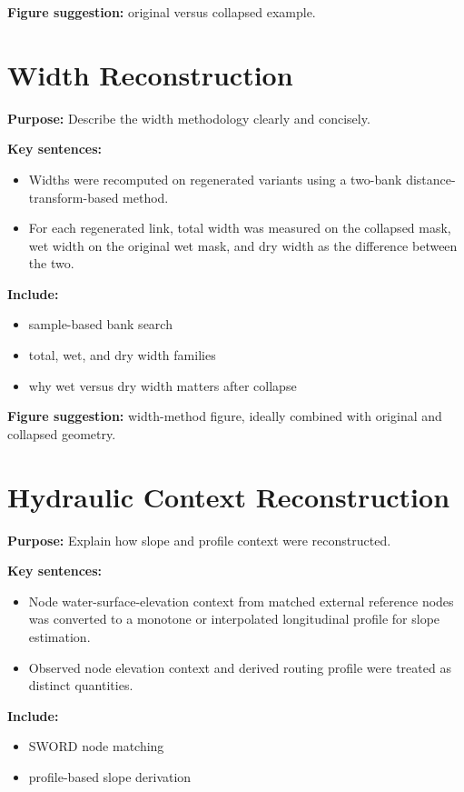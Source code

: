 \documentclass[11pt]{article}
\begin{document}
\textbf{Figure suggestion:} original versus collapsed example.

\section{Width Reconstruction}
\textbf{Purpose:} Describe the width methodology clearly and concisely.

\textbf{Key sentences:}
\begin{itemize}
\item Widths were recomputed on regenerated variants using a two-bank distance-transform-based method.
\item For each regenerated link, total width was measured on the collapsed mask, wet width on the original wet mask, and dry width as the difference between the two.
\end{itemize}

\textbf{Include:}
\begin{itemize}
\item sample-based bank search
\item total, wet, and dry width families
\item why wet versus dry width matters after collapse
\end{itemize}

\textbf{Figure suggestion:} width-method figure, ideally combined with original and collapsed geometry.

\section{Hydraulic Context Reconstruction}
\textbf{Purpose:} Explain how slope and profile context were reconstructed.

\textbf{Key sentences:}
\begin{itemize}
\item Node water-surface-elevation context from matched external reference nodes was converted to a monotone or interpolated longitudinal profile for slope estimation.
\item Observed node elevation context and derived routing profile were treated as distinct quantities.
\end{itemize}

\textbf{Include:}
\begin{itemize}
\item SWORD node matching
\item profile-based slope derivation
\end{itemize}
\end{document}
